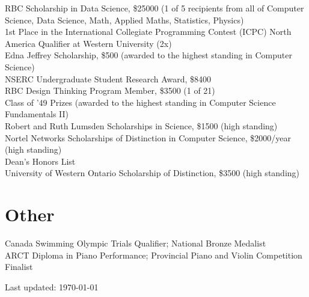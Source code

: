 \documentclass[11pt]{article} %
\begin{document}
 RBC Scholarship in Data Science, \$25000 (1 of 5 recipients from all of Computer Science, Data Science, Math, Applied Maths, Statistics, Physics) \\
 1st Place in the International Collegiate Programming Contest (ICPC) North America Qualifier at Western University (2x) \\
 Edna Jeffrey Scholarship, \$500 (awarded to the highest standing in Computer Science) \\
 NSERC Undergraduate Student Research Award, \$8400 \\
 RBC Design Thinking Program Member, \$3500 (1 of 21)\\
 Class of '49 Prizes (awarded to the highest standing in Computer Science Fundamentals II) \\
 Robert and Ruth Lumsden Scholarships in Science, \$1500 (high standing) \\
 Nortel Networks Scholarships of Distinction in Computer Science, \$2000/year (high standing)\\
 Dean's Honors List \\
 University of Western Ontario Scholarship of Distinction, \$3500 (high standing) \\


\section*{Other}
Canada Swimming Olympic Trials Qualifier; National Bronze Medalist \\
ARCT Diploma in Piano Performance; Provincial Piano and Violin Competition Finalist


\begin{center}
	\scriptsize
	Last updated: \today
\end{center}

\end{document}
